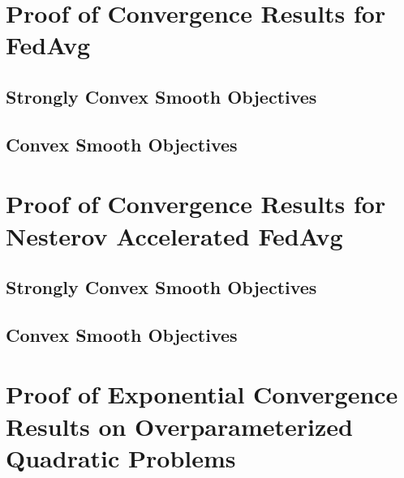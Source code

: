 


\section{Proof of Convergence Results for FedAvg}
\label{sec:app:fedavg}
\subsection{Strongly Convex Smooth Objectives}


\subsection{Convex Smooth Objectives}
\label{sec:nasgdscvxsmth}
%


\section{Proof of Convergence Results for Nesterov Accelerated FedAvg}
\label{sec:app:Nesterovfedavg}
\subsection{Strongly Convex Smooth Objectives}
\label{sec:convexsmoothsgd}
%


\subsection{Convex Smooth Objectives}
\label{sec:nasgdcvxsmth}
%


\section{Proof of Exponential Convergence Results on Overparameterized Quadratic Problems}
\label{sec:interpolation}


